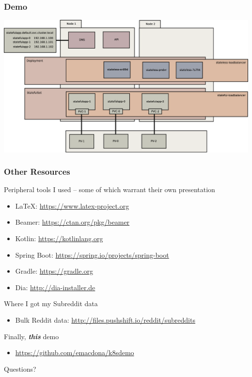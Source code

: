 \documentclass{beamer}
\begin{document}
\begin{frame}
    \frametitle{Demo}
    \includegraphics[width=\textwidth,height=0.85\textheight,keepaspectratio]{graphics/08-loadBalancer.eps}
\end{frame}

\begin{frame}
\frametitle{Other Resources}
Peripheral tools I used -- some of which warrant their own presentation
\begin{itemize}
    \item \LaTeX: \href{https://www.latex-project.org}{https://www.latex-project.org}
    \item Beamer: \href{https://ctan.org/pkg/beamer}{https://ctan.org/pkg/beamer}
    \item Kotlin: \href{https://kotlinlang.org}{https://kotlinlang.org}
    \item Spring Boot: \href{https://spring.io/projects/spring-boot}{https://spring.io/projects/spring-boot}
    \item Gradle: \href{https://gradle.org}{https://gradle.org}
    \item Dia: \href{http://dia-installer.de}{http://dia-installer.de}
\end{itemize}
\smallskip
Where I got my Subreddit data
\begin{itemize}
    \item Bulk Reddit data: \href{http://files.pushshift.io/reddit/subreddits}{http://files.pushshift.io/reddit/subreddits}
\end{itemize}
Finally, \textbf{\textit{this}} demo
\begin{itemize}
    \item \href{https://github.com/emacdona/k8sdemo}{https://github.com/emacdona/k8sdemo}
\end{itemize}
\end{frame}

\begin{frame}
    \begin{center}
        \Huge Questions?
    \end{center}
\end{frame}
\end{document}
